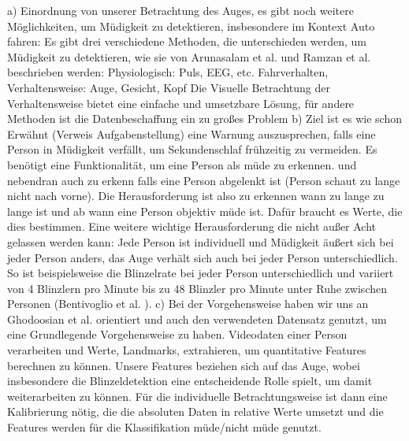a) Einordnung von unserer Betrachtung des Auges, es gibt noch weitere Möglichkeiten, um Müdigkeit zu detektieren, insbesondere im Kontext Auto fahren:
Es gibt drei verschiedene Methoden, die unterschieden werden, um Müdigkeit zu detektieren, wie sie von Arunasalam et al. \cite{AR20} und Ramzan et al. \cite{RA19} beschrieben werden:
Physiologisch: Puls, EEG, etc.
Fahrverhalten, 
Verhaltensweise: Auge, Gesicht, Kopf
Die Visuelle Betrachtung der Verhaltensweise bietet eine einfache und umsetzbare Lösung, für andere Methoden ist die Datenbeschaffung ein zu großes Problem
b) Ziel ist es wie schon Erwähnt (Verweis Aufgabenstellung) eine Warnung auszusprechen, falls eine Person in Müdigkeit verfällt, um Sekundenschlaf frühzeitig zu vermeiden.
Es benötigt eine Funktionalität, um eine Person als müde zu erkennen. und nebendran auch zu erkenn falls eine Person abgelenkt ist (Person schaut zu lange nicht nach vorne). Die Herausforderung ist also zu erkennen wann zu lange zu lange ist und ab wann eine Person objektiv müde ist. Dafür braucht es Werte, die dies bestimmen. Eine weitere wichtige Herausforderung die nicht außer Acht gelassen werden kann: Jede Person ist individuell und Müdigkeit äußert sich bei jeder Person anders, das Auge verhält sich auch bei jeder Person unterschiedlich. So ist beispielsweise die Blinzelrate bei jeder Person unterschiedlich und variiert von 4 Blinzlern pro Minute bis zu 48 Blinzler pro Minute unter Ruhe zwischen Personen (Bentivoglio et al. \cite{BE97}). 
c) Bei der Vorgehensweise haben wir uns an Ghodoosian et al. \cite{GH19} orientiert und auch den verwendeten Datensatz genutzt, um eine Grundlegende Vorgehensweise zu haben. Videodaten einer Person verarbeiten und Werte, Landmarks, extrahieren, um quantitative Features berechnen zu können. Unsere Features beziehen sich auf das Auge, wobei insbesondere die Blinzeldetektion eine entscheidende Rolle spielt, um damit weiterarbeiten zu können. Für die individuelle Betrachtungsweise ist dann eine Kalibrierung nötig, die die absoluten Daten in relative Werte umsetzt und die Features werden für die Klassifikation müde/nicht müde genutzt.


